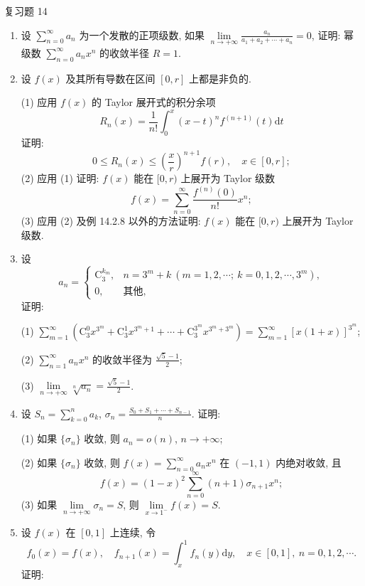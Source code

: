 
\begin{exblock}{复习题 14}
\begin{enumerate}
  \item 设 $\sum_{n=0}^{\infty}a_{n}$ 为一个发散的正项级数, 如果 $\lim\limits_{n\to+\infty}\frac{a_{n}}{a_{1}+a_{2}+\cdots+a_{n}}=0$, 证明: 幂级数 $\sum_{n=0}^{\infty}a_{n}x^{n}$ 的收敛半径 $R=1$.
  \item 设 $f(x)$ 及其所有导数在区间 $[0,r]$ 上都是非负的.

  (1) 应用 $f(x)$ 的 Taylor 展开式的积分余项
  \[
    R_{n}(x)=\frac{1}{n!}\int_{0}^{x}(x-t)^{n}f^{(n+1)}(t)\mathrm{d}t
\]
  证明:
  \[
    0\leqslant R_{n}(x)\leqslant\left(\frac{x}{r}\right)^{n+1}f(r),\quad x\in[0,r];
\]
  (2) 应用 (1) 证明: $f(x)$ 能在 $[0,r)$ 上展开为 Taylor 级数
  \[
    f(x)=\sum_{n=0}^{\infty}\frac{f^{(n)}(0)}{n!}x^{n};
\]
  (3) 应用 (2) 及例 14.2.8 以外的方法证明: $f(x)$ 能在 $[0,r)$ 上展开为 Taylor 级数.
  \item 设
  \[
    a_{n}=\begin{cases}
      \mathrm{C}_{3}^{k_{m}}, & n=3^{m}+k\ (m=1,2,\cdots;\ k=0,1,2,\cdots,3^{m}),\\
      0, & \text{其他},
\end{cases}
\]
  证明:

  (1) $\displaystyle\sum_{m=1}^{\infty}\left(\mathrm{C}_{3}^{0}x^{3^{m}}+\mathrm{C}_{3}^{1}x^{3^{m}+1}+\cdots+\mathrm{C}_{3}^{3^{m}}x^{3^{m}+3^{m}}\right)=\sum_{m=1}^{\infty}[x(1+x)]^{3^{m}}$;

  (2) $\sum_{n=1}^{\infty}a_{n}x^{n}$ 的收敛半径为 $\frac{\sqrt{5}-1}{2}$;

  (3) $\lim\limits_{n\to+\infty}\sqrt[n]{a_{n}}=\frac{\sqrt{5}-1}{2}$.
  \item 设 $S_{n}=\sum_{k=0}^{n}a_{k}$, $\sigma_{n}=\frac{S_{0}+S_{1}+\cdots+S_{n-1}}{n}$. 证明:

  (1) 如果 $\{\sigma_{n}\}$ 收敛, 则 $a_{n}=o(n)$, $n\to+\infty$;

  (2) 如果 $\{\sigma_{n}\}$ 收敛, 则 $f(x)=\sum_{n=0}^{\infty}a_{n}x^{n}$ 在 $(-1,1)$ 内绝对收敛, 且
  \[
    f(x)=(1-x)^{2}\sum_{n=0}^{\infty}(n+1)\sigma_{n+1}x^{n};
\]
  (3) 如果 $\lim\limits_{n\to+\infty}\sigma_{n}=S$, 则 $\lim\limits_{x\to1^{-}}f(x)=S$.
  \item 设 $f(x)$ 在 $[0,1]$ 上连续, 令
  \[
    f_{0}(x)=f(x),\quad f_{n+1}(x)=\int_{x}^{1}f_{n}(y)\mathrm{d}y,\quad x\in[0,1],\ n=0,1,2,\cdots.
\]
  证明:


\end{enumerate}
\end{exblock}
